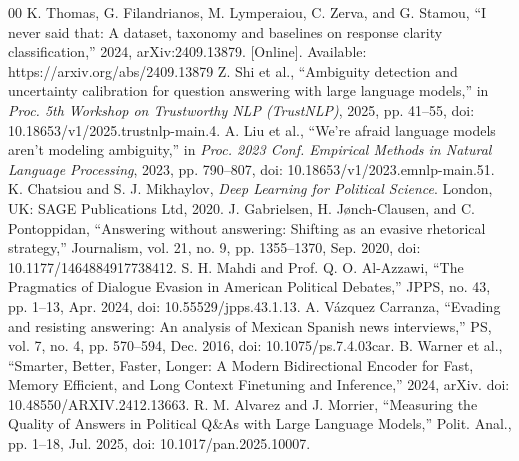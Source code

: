 \begin{thebibliography}{00}
 K. Thomas, G. Filandrianos, M. Lymperaiou, C. Zerva, and G. Stamou, ``I never said that: A dataset, taxonomy and baselines on response clarity classification,'' 2024, arXiv:2409.13879. [Online]. Available: https://arxiv.org/abs/2409.13879
 Z. Shi et al., ``Ambiguity detection and uncertainty calibration for question answering with large language models,'' in \textit{Proc. 5th Workshop on Trustworthy NLP (TrustNLP)}, 2025, pp. 41--55, doi: 10.18653/v1/2025.trustnlp-main.4.
 A. Liu et al., ``We're afraid language models aren't modeling ambiguity,'' in \textit{Proc. 2023 Conf. Empirical Methods in Natural Language Processing}, 2023, pp. 790--807, doi: 10.18653/v1/2023.emnlp-main.51.
 K. Chatsiou and S. J. Mikhaylov, \textit{Deep Learning for Political Science}. London, UK: SAGE Publications Ltd, 2020.
 J. Gabrielsen, H. Jønch-Clausen, and C. Pontoppidan, “Answering without answering: Shifting as an evasive rhetorical strategy,” Journalism, vol. 21, no. 9, pp. 1355–1370, Sep. 2020, doi: 10.1177/1464884917738412.
 S. H. Mahdi and Prof. Q. O. Al-Azzawi, “The Pragmatics of Dialogue Evasion in American Political Debates,” JPPS, no. 43, pp. 1–13, Apr. 2024, doi: 10.55529/jpps.43.1.13.
 A. Vázquez Carranza, “Evading and resisting answering: An analysis of Mexican Spanish news interviews,” PS, vol. 7, no. 4, pp. 570–594, Dec. 2016, doi: 10.1075/ps.7.4.03car.
 B. Warner et al., “Smarter, Better, Faster, Longer: A Modern Bidirectional Encoder for Fast, Memory Efficient, and Long Context Finetuning and Inference,” 2024, arXiv. doi: 10.48550/ARXIV.2412.13663.
 R. M. Alvarez and J. Morrier, “Measuring the Quality of Answers in Political Q\&As with Large Language Models,” Polit. Anal., pp. 1–18, Jul. 2025, doi: 10.1017/pan.2025.10007.
\end{thebibliography}